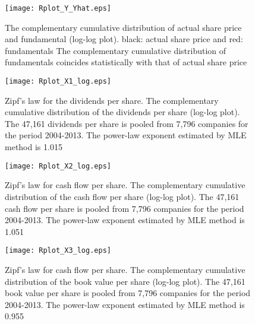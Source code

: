 \documentclass[10pt,a4paper]{article}
\begin{document}
\begin{figure}[h]
\texttt{[image: Rplot\_Y\_Yhat.eps]}\\  
\caption{The complementary cumulative distribution of actual share price and fundamental (log-log plot). black: actual share price and red: fundamentals The complementary cumulative distribution of fundamentals coincides statistically with that of actual share price } 
\end{figure}

\begin{figure}
\texttt{[image: Rplot\_X1\_log.eps]}\\
\caption{Zipf's law for the dividends per share. The complementary cumulative distribution of the dividends per share (log-log plot). The 47,161 dividends per share is pooled from 7,796 companies for the period 2004-2013. The power-law exponent estimated by MLE method is 1.015}
\end{figure}
\begin{figure}[h]
\texttt{[image: Rplot\_X2\_log.eps]}\\  
\caption{Zipf's law for cash flow per share. The complementary cumulative distribution of the cash flow per share (log-log plot). The 47,161 cash flow per share is pooled from 7,796 companies for the period 2004-2013. The power-law exponent estimated by MLE method is 1.051 }
\end{figure}
\begin{figure}[h]
\texttt{[image: Rplot\_X3\_log.eps]}\\
\caption{Zipf's law for cash flow per share. The complementary cumulative distribution of the book value per share (log-log plot). The 47,161 book value per share is pooled from 7,796 companies for the period 2004-2013. The power-law exponent estimated by MLE method is 0.955 }
\end{figure}
\end{document}

